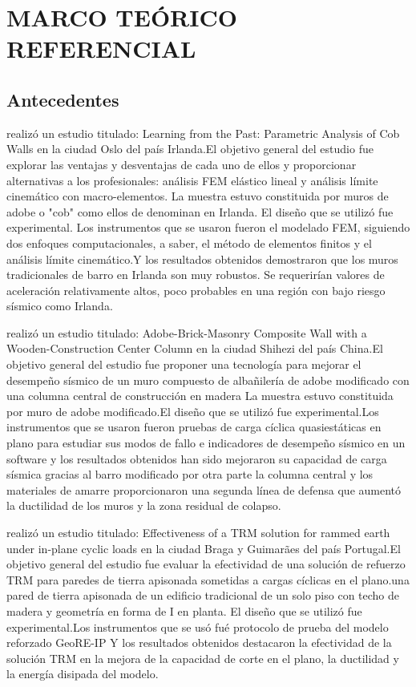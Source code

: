 \chapter{MARCO TEÓRICO REFERENCIAL}
\section{Antecedentes}
\cite{JimenezRios2023} realizó un estudio titulado: Learning from the Past: Parametric Analysis of Cob Walls en la ciudad Oslo del país Irlanda.El objetivo general del estudio fue explorar las ventajas y desventajas de cada uno de ellos y proporcionar alternativas a los profesionales: análisis FEM elástico lineal y análisis límite cinemático con macro-elementos. La muestra estuvo constituida por muros de adobe o "cob" como ellos de denominan en Irlanda. El diseño que se utilizó fue experimental. Los instrumentos que se usaron fueron el modelado FEM,  siguiendo dos enfoques computacionales, a saber, el método de elementos finitos y el análisis límite cinemático.Y los resultados obtenidos demostraron que los muros tradicionales de barro en Irlanda son muy robustos. Se requerirían valores de aceleración relativamente altos, poco probables en una región con bajo riesgo sísmico como Irlanda.

\cite{Wang2023} realizó un estudio titulado: Adobe-Brick-Masonry Composite Wall with a Wooden-Construction Center Column en la ciudad Shihezi del país China.El objetivo general del estudio fue proponer una tecnología para mejorar el desempeño sísmico de un muro compuesto de albañilería de adobe modificado con una columna central de construcción en madera La muestra estuvo constituida por muro de adobe modificado.El diseño que se utilizó fue experimental.Los instrumentos que se usaron fueron  pruebas de carga cíclica quasiestáticas en plano para estudiar sus modos de fallo e indicadores de desempeño sísmico en un software y los resultados obtenidos han sido mejoraron su capacidad de carga sísmica gracias al barro modificado por otra parte la columna central y los materiales de amarre proporcionaron una segunda línea de defensa que aumentó la ductilidad de los muros y la zona residual de colapso.

\cite{Romanazzi2023} realizó un estudio titulado:  Effectiveness of a TRM solution for rammed earth under in-plane cyclic loads en la ciudad Braga y Guimarães del país Portugal.El objetivo general del estudio fue evaluar la efectividad de una solución de refuerzo TRM para paredes de tierra apisonada sometidas a cargas cíclicas en el plano.una pared de tierra apisonada de un edificio tradicional de un solo piso con techo de madera y geometría en forma de I en planta. El diseño que se utilizó fue experimental.Los instrumentos que se usó fué protocolo de prueba del modelo reforzado GeoRE-IP Y los resultados obtenidos destacaron la efectividad de la solución TRM en la mejora de la capacidad de corte en el plano, la ductilidad y la energía disipada del modelo.

